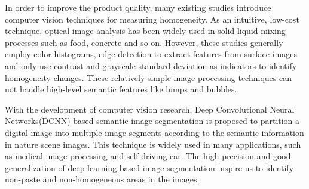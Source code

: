 \documentclass[pdflatex,sn-mathphys]{sn-jnl}%
\theoremstyle{thmstyleone}%
\theoremstyle{thmstyletwo}%
\theoremstyle{thmstylethree}%
\begin{document}
In order to improve the product quality, many existing studies introduce computer vision techniques for measuring homogeneity. 
As an intuitive, low-cost technique, optical image analysis has been widely used in solid-liquid mixing processes\cite{VisionHomoReviewer} such as food\cite{VisionHomoFood}, concrete\cite{VisionHomoInConcrete} and so on. 
However, these studies generally employ color histograms, edge detection to extract features from surface images and only use contrast and grayscale standard deviation as indicators to identify  homogeneity changes.          
These relatively simple image processing techniques can not handle high-level semantic features like lumps and bubbles. 

With the development of computer vision research, Deep Convolutional Neural Networks(DCNN) based semantic image segmentation is proposed to partition a digital image into multiple image segments according to the semantic information in nature scene images\cite{ImageSegmentation}.
This technique is widely used in many applications, such as medical image processing and self-driving car.
The high precision and good generalization of deep-learning-based image segmentation inspire us to identify non-paste and non-homogeneous areas in the images.
\end{document}
